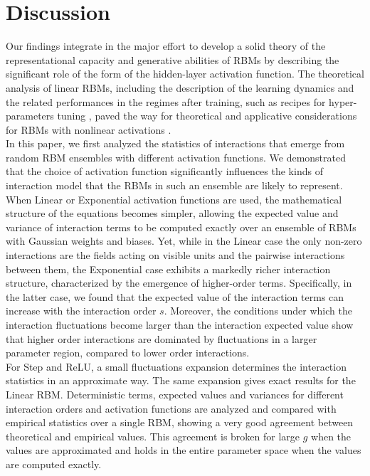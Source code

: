 \documentclass[11pt,letterpaper]{article}
\renewcommand{\red}[1]{#1}
\begin{document}
\section{Discussion}
Our findings {\red integrate in the major effort to develop a solid theory of the representational capacity and generative abilities of RBMs \cite{diSarra_2025,10.1007/978-3-642-33275-3_2,decelle2021restricted, e23010034,fachechi2025fundamental,decelle2024inferring} by describing} the significant role of the form of the hidden-layer activation function. {\red The theoretical analysis of linear RBMs, including the description of the learning dynamics and the related performances in the regimes after training, such as recipes for hyper-parameters tuning \cite{fachechi2025fundamental}, paved the way for theoretical and applicative considerations for RBMs with nonlinear activations \cite{diSarra_2025}.}\\
{ \red In this paper,} we first analyzed the statistics of interactions that emerge from random RBM ensembles with different activation functions. We demonstrated that the choice of activation function significantly influences the kinds of interaction model that the RBMs in such an ensemble are likely to represent. When Linear or Exponential activation functions are used, the mathematical structure of the equations becomes simpler, allowing the expected value and variance of interaction terms to be computed exactly over an ensemble of RBMs with Gaussian weights and biases. Yet, while in the Linear case the only non-zero interactions are the fields acting on visible units and the pairwise interactions between them, the Exponential case exhibits a markedly richer interaction structure, characterized by the emergence of higher-order terms. Specifically, in the latter case, we found that the expected value of the interaction terms can increase with the interaction order $s$. Moreover, the conditions under which the interaction fluctuations become larger than the interaction expected value show that higher order interactions are dominated by fluctuations in a larger parameter region, compared to lower order interactions.\\
For Step and ReLU, a small fluctuations expansion determines the interaction statistics in an approximate way. The same expansion gives exact results for the Linear RBM. Deterministic terms, expected values and variances for different interaction orders and activation functions are analyzed and compared with empirical statistics over a single RBM, showing a very good agreement between theoretical and empirical values. This agreement is broken for large $g$ when the values are approximated and holds in the entire parameter space when the values are computed exactly.\\
\end{document}
